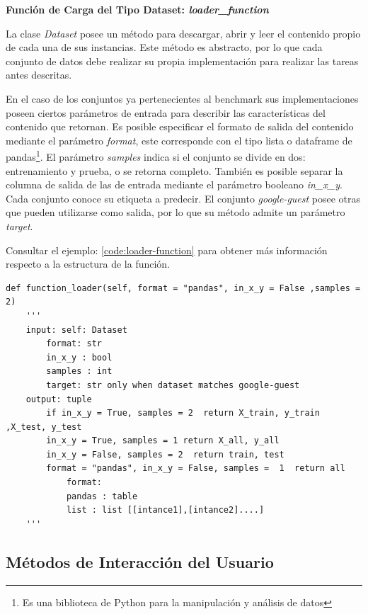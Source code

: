 \begin{flushleft} 
    { \textbf{Función de Carga del Tipo Dataset: \textit{loader\_function}}}\label{class:loader-function}
\end{flushleft}
La clase \textit{Dataset} posee un método para descargar, abrir y leer el contenido propio de cada una de sus instancias.
Este método es abstracto, por lo que cada conjunto de datos debe realizar su propia implementación para realizar las tareas antes descritas. 

En el caso de los conjuntos ya pertenecientes al benchmark sus implementaciones poseen ciertos parámetros de entrada para describir las características del 
contenido que retornan. Es posible especificar el formato de salida del contenido mediante el parámetro \textit{format}, este corresponde con el tipo lista o 
dataframe de pandas\footnote{Es una biblioteca de Python para la manipulación y análisis de datos}. 
El parámetro \textit{samples} indica si el conjunto se divide en dos: entrenamiento y prueba, o se retorna completo. 
También es posible separar la columna de salida de las de entrada mediante el parámetro booleano \textit{in\_x\_y}. 
Cada conjunto conoce su etiqueta a predecir. El conjunto \textit{google-guest} posee otras que pueden utilizarse como salida, por lo que su método admite un 
parámetro \textit{target}.  

Consultar el ejemplo: \ref{code:loader-function} para obtener más información respecto a la estructura de la función. 

\begin{lstlisting}[caption=Estructura de las fuciones de carga de los dataset, label = code:loader-function]
def function_loader(self, format = "pandas", in_x_y = False ,samples =  2)
    '''
    input: self: Dataset
        format: str
        in_x_y : bool
        samples : int
        target: str only when dataset matches google-guest
    output: tuple	   
        if in_x_y = True, samples = 2  return X_train, y_train ,X_test, y_test
        in_x_y = True, samples = 1 return X_all, y_all
        in_x_y = False, samples = 2  return train, test
        format = "pandas", in_x_y = False, samples =  1  return all
            format:
            pandas : table 
            list : list [[intance1],[intance2]....]
    '''
    \end{lstlisting}


\subsection{Métodos de Interacción del Usuario}\label{subsection:methods}

